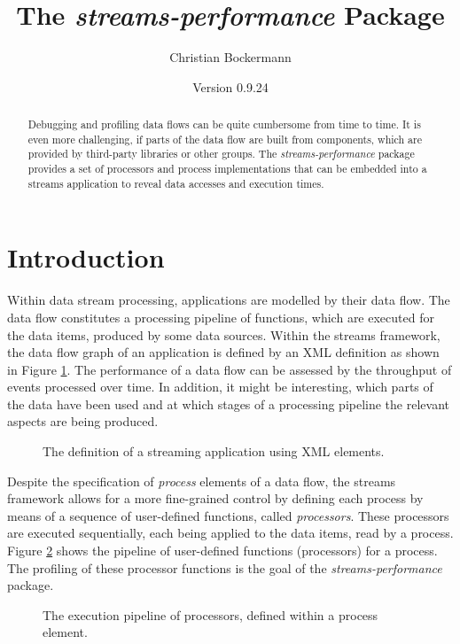 \documentclass[german,a4,12pt]{scrartcl}
\title{The {\em streams-performance} Package}
\author{Christian Bockermann}
\date{\normalsize Version 0.9.24}
\begin{document}
\maketitle
\begin{abstract}
Debugging and profiling data flows can be quite cumbersome from time to time. It is
even more challenging, if parts of the data flow are built from components, which are
provided by third-party libraries or other groups. The
{\em streams-performance} package provides a set of processors and process implementations
that can be embedded into a \textsf{streams} application to reveal data accesses and
execution times.
\end{abstract}

\section{Introduction}
Within data stream processing, applications are modelled by their data flow. The data
flow constitutes a processing pipeline of functions, which are executed for the data
items, produced by some data sources. Within the \textsf{streams} framework, the data
flow graph of an application is defined by an XML definition as shown in Figure \ref{fig:xml}.
The performance of a data flow can be assessed by the throughput of events processed
over time. In addition, it might be interesting, which parts of the data have been used
and at which stages of a processing pipeline the relevant aspects are being produced.

\begin{figure}[h!]
\centering

\caption{\label{fig:xml}The definition of a streaming application using XML elements.}
\end{figure}


Despite the specification of {\em process} elements of a data flow, the \textsf{streams}
framework allows for a more fine-grained control by defining each process by means of
a sequence of user-defined functions, called {\em processors}. These processors are
executed sequentially, each being applied to the data items, read by a process. Figure
\ref{fig:pipeline} shows the pipeline of user-defined functions (processors) for a process.
The profiling of these processor functions is the goal of the {\em streams-performance}
package.

\begin{figure}[h!]
\centering
\begin{tikzpicture}[scale=0.75,transform shape]

\end{tikzpicture}
\caption{\label{fig:pipeline}The execution pipeline of processors, defined within a process element.}
\end{figure}
\end{document}
